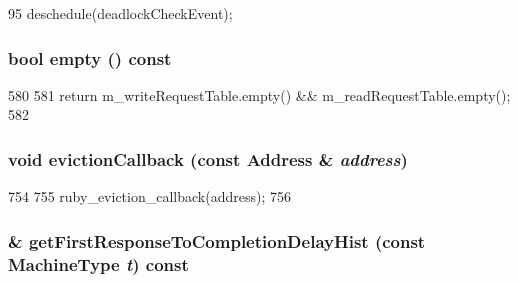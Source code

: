 \begin{DoxyCode}
95     { deschedule(deadlockCheckEvent); }
\end{DoxyCode}
\hypertarget{classSequencer_ac6e61de369e994009e36f344f99c15ad}{
\subsubsection[{empty}]{\setlength{\rightskip}{0pt plus 5cm}bool empty () const}}
\label{classSequencer_ac6e61de369e994009e36f344f99c15ad}



\begin{DoxyCode}
580 {
581     return m_writeRequestTable.empty() && m_readRequestTable.empty();
582 }
\end{DoxyCode}
\hypertarget{classSequencer_a3af79aeefd596a230ebc3a579fcc3fb1}{
\subsubsection[{evictionCallback}]{\setlength{\rightskip}{0pt plus 5cm}void evictionCallback (const {\bf Address} \& {\em address})}}
\label{classSequencer_a3af79aeefd596a230ebc3a579fcc3fb1}



\begin{DoxyCode}
754 {
755     ruby_eviction_callback(address);
756 }
\end{DoxyCode}
\hypertarget{classSequencer_a9f0e5366d9f6881645645f94fa07f5df}{
\subsubsection[{getFirstResponseToCompletionDelayHist}]{\& getFirstResponseToCompletionDelayHist (const MachineType {\em t}) const}}
\label{classSequencer_a9f0e5366d9f6881645645f94fa07f5df}



